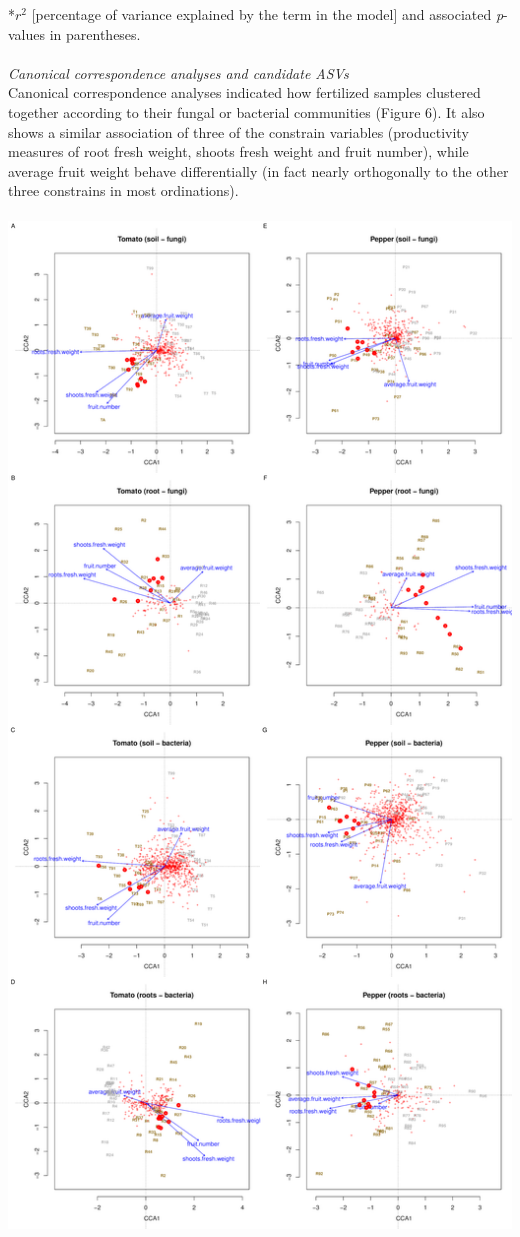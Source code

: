 \documentclass[11pt,]{article}
\begin{document}
*\(r^2\) {[}percentage of variance explained by the term in the model{]}
and associated \emph{p}-values in parentheses. ~\\
\hspace*{0.333em}\\
\emph{Canonical correspondence analyses and candidate ASVs}\\
Canonical correspondence analyses indicated how fertilized samples
clustered together according to their fungal or bacterial communities
(Figure 6). It also shows a similar association of three of the
constrain variables (productivity measures of root fresh weight, shoots
fresh weight and fruit number), while average fruit weight behave
differentially (in fact nearly orthogonally to the other three
constrains in most ordinations).\\
\hspace*{0.333em}\\
\newpage   \includegraphics{../figures/Figure6_rda.pdf}\\
\end{document}
